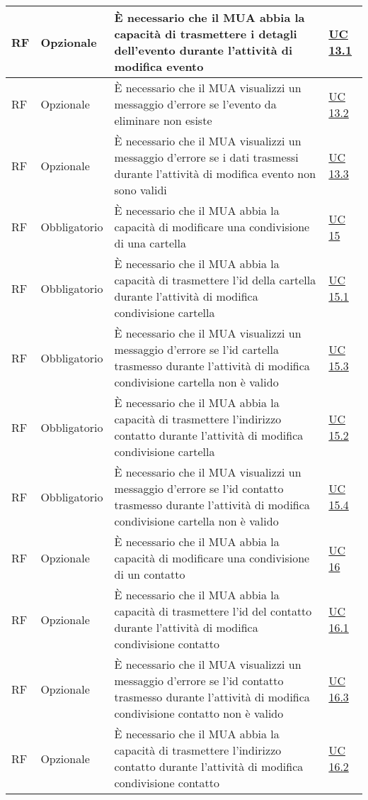 \begin{longtable}{*{1}{>{\centering\arraybackslash}p{1.5cm}}*{1}{>{\centering\arraybackslash}p{2.5cm}}p{6cm}*{1}{>{\centering\arraybackslash}p{3cm}}}
    \\\hline
    RF & Opzionale & È necessario che il MUA abbia la capacità di trasmettere i detagli dell'evento durante l'attività di modifica evento & \hyperref[sec:UC13.1]{UC 13.1}
    \\\hline
    RF & Opzionale & È necessario che il MUA visualizzi un messaggio d'errore se l'evento da eliminare non esiste & \hyperref[sec:UC13.2]{UC 13.2}
    \\\hline
    RF & Opzionale & È necessario che il MUA visualizzi un messaggio d'errore se i dati trasmessi durante l'attività di modifica evento non sono validi & \hyperref[sec:UC13.3]{UC 13.3}
    \\\hline
    RF & Obbligatorio & È necessario che il MUA abbia la capacità di modificare una condivisione di una cartella & \hyperref[sec:UC15]{UC 15}
    \\\hline
    RF & Obbligatorio & È necessario che il MUA abbia la capacità di trasmettere l'id della cartella durante l'attività di modifica condivisione cartella & \hyperref[sec:UC15.1]{UC 15.1}
    \\\hline
    RF & Obbligatorio & È necessario che il MUA visualizzi un messaggio d'errore se l'id cartella trasmesso durante l'attività di modifica condivisione cartella non è valido & \hyperref[sec:UC15.3]{UC 15.3}
    \\\hline
    RF & Obbligatorio & È necessario che il MUA abbia la capacità di trasmettere l'indirizzo contatto durante l'attività di modifica condivisione cartella & \hyperref[sec:UC15.2]{UC 15.2}
    \\\hline
    RF & Obbligatorio & È necessario che il MUA visualizzi un messaggio d'errore se l'id contatto trasmesso durante l'attività di modifica condivisione cartella non è valido & \hyperref[sec:UC15.4]{UC 15.4}
    \\\hline
    RF & Opzionale & È necessario che il MUA abbia la capacità di modificare una condivisione di un contatto & \hyperref[sec:UC16]{UC 16}
    \\\hline
    RF & Opzionale & È necessario che il MUA abbia la capacità di trasmettere l'id del contatto durante l'attività di modifica condivisione contatto & \hyperref[sec:UC16.1]{UC 16.1}
    \\\hline
    RF & Opzionale & È necessario che il MUA visualizzi un messaggio d'errore se l'id contatto trasmesso durante l'attività di modifica condivisione contatto non è valido & \hyperref[sec:UC16.3]{UC 16.3}
    \\\hline
    RF & Opzionale & È necessario che il MUA abbia la capacità di trasmettere l'indirizzo contatto durante l'attività di modifica condivisione contatto & \hyperref[sec:UC16.2]{UC 16.2}

\end{longtable}
